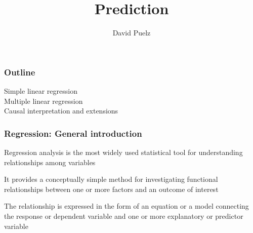 \documentclass{beamer}
\title[]{\Large{Prediction}\\ \vspace{5mm}}
\subtitle{}
\author{David Puelz }
\institute[] %
{

}
\date{} %
\newcommand{\bo}[1]{\textcolor{burntorange}{#1}}
\begin{document}
{
\begin{frame}[noframenumbering]
\vspace{12mm}
\vspace{5mm}
\titlepage %
\end{frame}
}







\begin{frame}
	\frametitle{Outline}
	
	\vspace{8mm}
Simple linear regression \\
	$$$$
Multiple linear regression \\
	$$$$
Causal interpretation and extensions \\	
\end{frame}

\begin{frame}
\frametitle{Regression: General introduction} 

\vspace{-0.5cm}


\bo{Regression analysis} is the most widely used statistical 
tool for understanding relationships among variables \\ \vspace{8mm}

It provides a conceptually simple method for investigating 
functional relationships between one or more factors and 
an outcome of interest \\ \vspace{8mm}

The relationship is expressed in the form of an equation 
or a model connecting the response or dependent 
variable and one or more explanatory or predictor variable


\end{frame}
\end{document}
